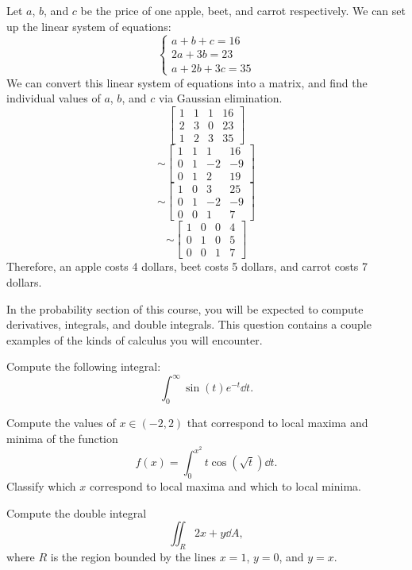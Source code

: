 \documentclass[11pt]{article}
\begin{document}
\begin{solution}
  Let $a$, $b$, and $c$ be the price of one apple, beet, and carrot respectively.
  We can set up the linear system of equations:
  $$\begin{cases}
    a + b + c = 16\\
    2a + 3b = 23\\
    a + 2b + 3c = 35
  \end{cases}$$
  We can convert this linear system of equations into a matrix, and find the
  individual values of $a$, $b$, and $c$ via Gaussian elimination.
  $$\begin{bmatrix}
    1 & 1 & 1 & 16\\
    2 & 3 & 0 & 23\\
    1 & 2 & 3 & 35
  \end{bmatrix}$$
  $$\sim\begin{bmatrix}
    1 & 1 & 1 & 16\\
    0 & 1 & -2 & -9\\
    0 & 1 & 2 & 19
  \end{bmatrix}$$
  $$\sim\begin{bmatrix}
    1 & 0 & 3 & 25\\
    0 & 1 & -2 & -9\\
    0 & 0 & 1 & 7
  \end{bmatrix}$$
  $$\sim\begin{bmatrix}
    1 & 0 & 0 & 4\\
    0 & 1 & 0 & 5\\
    0 & 0 & 1 & 7
  \end{bmatrix}$$
  Therefore, an apple costs 4 dollars, beet costs 5 dollars, and carrot costs 7 dollars.
\end{solution}

\newpage {}

In the probability section of this course, you will be expected to compute derivatives, integrals, and double integrals. This question contains a couple examples of the kinds of calculus you will encounter.

\begin{Parts}
    \Part Compute the following integral:
        \[
            \int_0^{\infty} \sin(t)e^{-t} \dd{t}.
        \]
    
    \Part Compute the values of $x \in (-2, 2)$ that correspond to local maxima and minima of the function
    \[f(x) = \int_{0}^{x^2} t\cos(\sqrt{t}) \dd{t}.\]
    Classify which $x$ correspond to local maxima and which to local minima.

    \Part Compute the double integral
    \[\iint_{R} 2x + y \dd{A},\]
    where $R$ is the region bounded by the lines $x = 1$, $y = 0$, and $y = x$.
\end{Parts}
\end{document}
